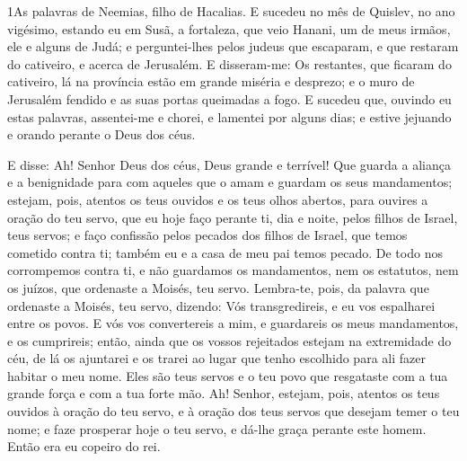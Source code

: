 
\lettrine{1} As palavras de Neemias, filho de Hacalias. E
sucedeu no mês de Quislev, no ano vigésimo, estando eu em Susã, a
fortaleza, que veio Hanani, um de meus irmãos, ele e alguns de
Judá; e perguntei-lhes pelos judeus que escaparam, e que restaram do
cativeiro, e acerca de Jerusalém. E disseram-me: Os restantes,
que ficaram do cativeiro, lá na província estão em grande miséria e
desprezo; e o muro de Jerusalém fendido e as suas portas queimadas a
fogo. E sucedeu que, ouvindo eu estas palavras, assentei-me e
chorei, e lamentei por alguns dias; e estive jejuando e orando
perante o Deus dos céus.

E disse: Ah! Senhor Deus dos céus, Deus grande e terrível! Que
guarda a aliança e a benignidade para com aqueles que o amam e
guardam os seus mandamentos; estejam, pois, atentos os teus
ouvidos e os teus olhos abertos, para ouvires a oração do teu servo,
que eu hoje faço perante ti, dia e noite, pelos filhos de Israel,
teus servos; e faço confissão pelos pecados dos filhos de Israel,
que temos cometido contra ti; também eu e a casa de meu pai temos
pecado. De todo nos corrompemos contra ti, e não guardamos os
mandamentos, nem os estatutos, nem os juízos, que ordenaste a
Moisés, teu servo. Lembra-te, pois, da palavra que ordenaste a
Moisés, teu servo, dizendo: Vós transgredireis, e eu vos espalharei
entre os povos. E vós vos convertereis a mim, e guardareis os
meus mandamentos, e os cumprireis; então, ainda que os vossos
rejeitados estejam na extremidade do céu, de lá os ajuntarei e os
trarei ao lugar que tenho escolhido para ali fazer habitar o meu
nome. Eles são teus servos e o teu povo que resgataste com a
tua grande força e com a tua forte mão. Ah! Senhor, estejam,
pois, atentos os teus ouvidos à oração do teu servo, e à oração dos
teus servos que desejam temer o teu nome; e faze prosperar hoje o
teu servo, e dá-lhe graça perante este homem. Então era eu copeiro
do rei.

\medskip

